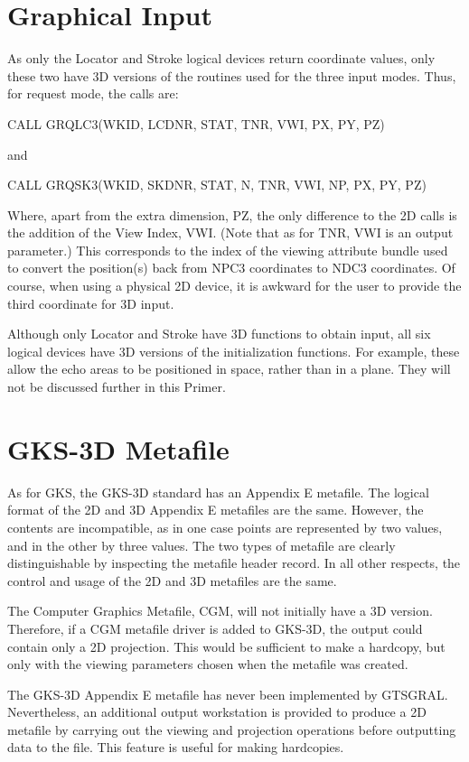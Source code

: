 \section{Graphical Input}
 
As only the Locator and Stroke logical devices return coordinate
values, only these two have 3D versions of the routines used
for the three input modes. Thus, for request mode, the calls are:
\begin{XMP}
CALL GRQLC3(WKID, LCDNR, STAT, TNR, VWI, PX, PY, PZ)
 
      and
 
CALL GRQSK3(WKID, SKDNR, STAT, N, TNR, VWI, NP, PX, PY, PZ)
\end{XMP}
Where, apart from the extra dimension, PZ, the only difference to the
2D calls is the addition of the View Index, VWI.
(Note that as for TNR, VWI is an output parameter.)
This corresponds to the index of the viewing attribute bundle used to
convert the position(s) back from NPC3 coordinates to NDC3 coordinates.
Of course, when using a physical 2D device, it is awkward for the user
to provide the third coordinate for 3D input.
 
Although only Locator and Stroke have 3D functions to obtain input,
all six logical devices have 3D versions of the initialization
functions. For example, these allow the echo areas to be positioned
in space, rather than in a plane. They will not be discussed
further in this Primer.
\section{GKS-3D Metafile}
 
As for GKS, the GKS-3D standard has an Appendix E metafile.
The logical format of the 2D and 3D Appendix E metafiles are the
same. However, the contents are incompatible, as in one
case points are represented by two values, and in the other by
three values. The two types of metafile are clearly distinguishable
by inspecting the metafile header record. In all other respects,
the control and usage of the 2D and 3D metafiles are the same.
 
The Computer Graphics Metafile, CGM, will not initially have a 3D
version. Therefore, if a CGM metafile driver is added to GKS-3D,
the output could contain only a 2D projection. This would be sufficient
to make a hardcopy, but only with the viewing parameters chosen
when the metafile was created.
\begin{note}
The GKS-3D Appendix E metafile has never been implemented by
GTSGRAL. Nevertheless, an additional output workstation is
provided to produce a 2D
metafile by carrying out the viewing and projection operations before
outputting data to the file. This feature is useful for making hardcopies.
\end{note}
